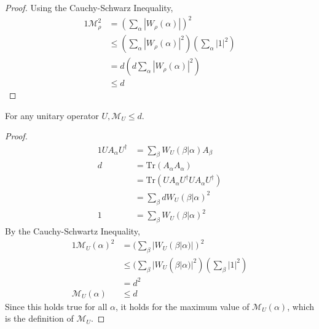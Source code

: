 \documentclass[../3Wworkreport.tex]{subfiles}
\begin{document}
\begin{appendices}
\begin{proof}
	Using the Cauchy-Schwarz Inequality,
	\begin{alignat}{1}
		\mathcal{M}_\rho^2 &= (\sum\limits_\alpha |W_\rho(\alpha)|)^2\\
		& \le (\sum\limits_\alpha |W_\rho(\alpha)|^2) (\sum\limits_\alpha |1|^2)\\
		&= d (d \sum\limits_\alpha |W_\rho(\alpha)|^2)\\
		& \le d
	\end{alignat}
\end{proof}

\begin{prop}\label{prop:manaunitary}
For any unitary operator $U, \mathcal{M}_U \le d$.
\end{prop}
\begin{proof}
	\begin{alignat}{1}
		U A_\alpha U^\dag &= \sum\limits_\beta W_U (\beta | \alpha) A_\beta\\
		d &= \text{Tr}(A_\alpha A_\alpha)\\
		&= \text{Tr}(U A_\alpha U^\dag U A_\alpha U^\dag)\\
		&= \sum\limits_\beta d W_U(\beta | \alpha)^2\\
		1 &= \sum\limits_\beta W_U(\beta | \alpha)^2
	\end{alignat}
	By the Cauchy-Schwartz Inequality,
	\begin{alignat}{1}
		\mathcal{M}_U(\alpha)^2 &= (\sum\limits_\beta |W_U(\beta | \alpha)|)^2\\
		&\le (\sum\limits_\beta |W_U(\beta | \alpha)|^2) (\sum\limits_\beta |1|^2)\\
		&= d^2\\
		\mathcal{M}_U(\alpha) &\le d
	\end{alignat}
	Since this holds true for all $\alpha$, it holds for the maximum value of $\mathcal{M}_U(\alpha)$, which is the definition of $\mathcal{M}_U$.
\end{proof}


\end{appendices}

\end{document}
